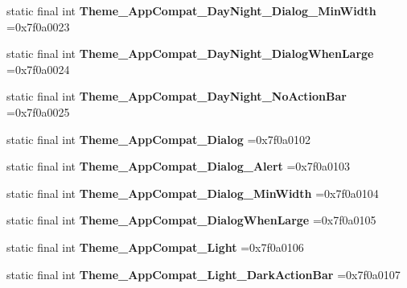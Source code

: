\begin{DoxyCompactItemize}
static final int {\bfseries Theme\+\_\+\+App\+Compat\+\_\+\+Day\+Night\+\_\+\+Dialog\+\_\+\+Min\+Width} =0x7f0a0023
\item 
\mbox{\label{classproject4_1_1xaria_1_1R_1_1style_abec093bb161f7f069a548ee55c69469f}} 
static final int {\bfseries Theme\+\_\+\+App\+Compat\+\_\+\+Day\+Night\+\_\+\+Dialog\+When\+Large} =0x7f0a0024
\item 
\mbox{\label{classproject4_1_1xaria_1_1R_1_1style_a93e4fb6b4a6beaa13b2b1dbb2d8774a8}} 
static final int {\bfseries Theme\+\_\+\+App\+Compat\+\_\+\+Day\+Night\+\_\+\+No\+Action\+Bar} =0x7f0a0025
\item 
\mbox{\label{classproject4_1_1xaria_1_1R_1_1style_ab662d84864f3522bec0473a0f709b326}} 
static final int {\bfseries Theme\+\_\+\+App\+Compat\+\_\+\+Dialog} =0x7f0a0102
\item 
\mbox{\label{classproject4_1_1xaria_1_1R_1_1style_a391f8b8202d4168e46a35ff1ded6187b}} 
static final int {\bfseries Theme\+\_\+\+App\+Compat\+\_\+\+Dialog\+\_\+\+Alert} =0x7f0a0103
\item 
\mbox{\label{classproject4_1_1xaria_1_1R_1_1style_acd7ef6aa0c7ad06fcb866290e13f5140}} 
static final int {\bfseries Theme\+\_\+\+App\+Compat\+\_\+\+Dialog\+\_\+\+Min\+Width} =0x7f0a0104
\item 
\mbox{\label{classproject4_1_1xaria_1_1R_1_1style_a7b5c30a88872f5e8bc2399996376d9c7}} 
static final int {\bfseries Theme\+\_\+\+App\+Compat\+\_\+\+Dialog\+When\+Large} =0x7f0a0105
\item 
\mbox{\label{classproject4_1_1xaria_1_1R_1_1style_ad95ad32f68ad8dd35634e91d8bb38d7d}} 
static final int {\bfseries Theme\+\_\+\+App\+Compat\+\_\+\+Light} =0x7f0a0106
\item 
\mbox{\label{classproject4_1_1xaria_1_1R_1_1style_a9298d44b9a12de64308cbb5e9063f6b6}} 
static final int {\bfseries Theme\+\_\+\+App\+Compat\+\_\+\+Light\+\_\+\+Dark\+Action\+Bar} =0x7f0a0107

\end{DoxyCompactItemize}
